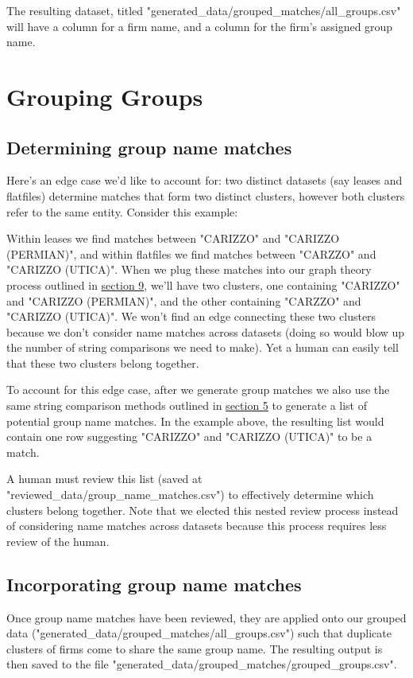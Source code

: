 \documentclass{article}
\begin{document}
The resulting dataset, titled "generated\_data/grouped\_matches/all\_groups.csv" will have a column for a firm name, and a column for the firm's assigned group name. 

\section{Grouping Groups}

\subsection{Determining group name matches}

Here's an edge case we'd like to account for: two distinct datasets (say leases and flatfiles) determine matches that form two distinct clusters, however both clusters refer to the same entity. Consider this example:

Within leases we find matches between "CARIZZO" and "CARIZZO (PERMIAN)", and within flatfiles we find matches between "CARZZO" and "CARIZZO (UTICA)". When we plug these matches into our graph theory process outlined in  \hyperref[sec:graph-theory]{section 9}, we'll have two clusters, one containing "CARIZZO" and "CARIZZO (PERMIAN)", and the other containing "CARZZO" and "CARIZZO (UTICA)". We won't find an edge connecting these two clusters because we don't consider name matches across datasets (doing so would blow up the number of string comparisons we need to make). Yet a human can easily tell that these two clusters belong together.

To account for this edge case, after we generate group matches we also use the same string comparison methods outlined in \hyperref[sec:matching]{section 5} to generate a list of potential group name matches. In the example above, the resulting list would contain one row suggesting "CARIZZO" and "CARIZZO (UTICA)" to be a match. 

A human must review this list (saved at "reviewed\_data/group\_name\_matches.csv") to effectively determine which clusters belong together. Note that we elected this nested review process instead of considering name matches across datasets because this process requires less review of the human. 

\subsection{Incorporating group name matches}

Once group name matches have been reviewed, they are applied onto our grouped data ("generated\_data/grouped\_matches/all\_groups.csv") such that duplicate clusters of firms come to share the same group name. The resulting output is then saved to the file "generated\_data/grouped\_matches/grouped\_groups.csv". 
\end{document}

